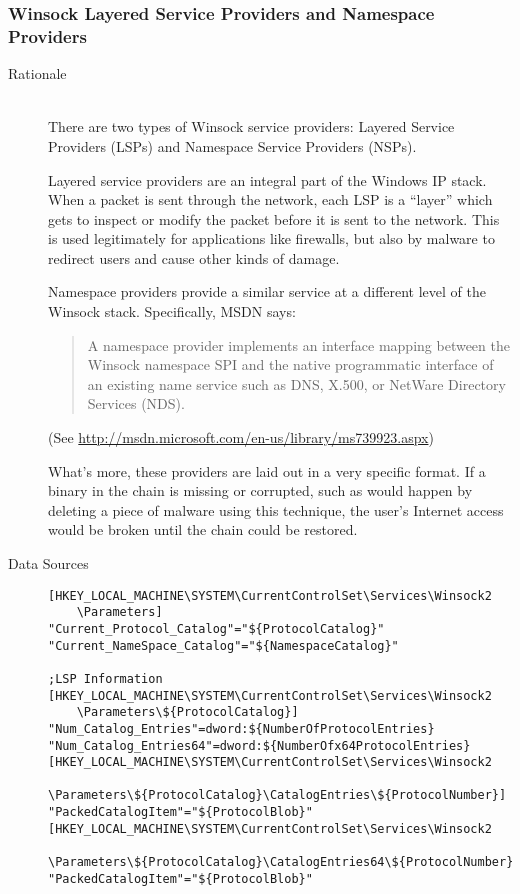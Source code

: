\subsubsection{Winsock Layered Service Providers and Namespace Providers}
\label{sec:lsp}
\begin{description}
\item[Rationale] \hfill \\
There are two types of Winsock service providers: Layered Service Providers
(LSPs) and Namespace Service Providers (NSPs).

Layered service providers are an integral part of the Windows IP stack. When a
packet is sent through the network, each LSP is a ``layer'' which gets to
inspect or modify the packet before it is sent to the network. This is used
legitimately for applications like firewalls, but also by malware to redirect
users and cause other kinds of damage.

Namespace providers provide a similar service at a different level of the
Winsock stack. Specifically, MSDN says:
\begin{quote}
A namespace provider implements an interface mapping between the Winsock
namespace SPI and the native programmatic interface of an existing name
service such as DNS, X.500, or NetWare Directory Services (NDS).
\end{quote}
(See \url{http://msdn.microsoft.com/en-us/library/ms739923.aspx})

What's more, these providers are laid out in a very specific format. If a binary
in the chain is missing or corrupted, such as would happen by deleting a piece
of malware using this technique, the user's Internet access would be broken
until the chain could be restored.
\item[Data Sources] \hfill
\begin{verbatim}
[HKEY_LOCAL_MACHINE\SYSTEM\CurrentControlSet\Services\Winsock2
    \Parameters]
"Current_Protocol_Catalog"="${ProtocolCatalog}"
"Current_NameSpace_Catalog"="${NamespaceCatalog}"

;LSP Information
[HKEY_LOCAL_MACHINE\SYSTEM\CurrentControlSet\Services\Winsock2
    \Parameters\${ProtocolCatalog}]
"Num_Catalog_Entries"=dword:${NumberOfProtocolEntries}
"Num_Catalog_Entries64"=dword:${NumberOfx64ProtocolEntries}
[HKEY_LOCAL_MACHINE\SYSTEM\CurrentControlSet\Services\Winsock2
    \Parameters\${ProtocolCatalog}\CatalogEntries\${ProtocolNumber}]
"PackedCatalogItem"="${ProtocolBlob}"
[HKEY_LOCAL_MACHINE\SYSTEM\CurrentControlSet\Services\Winsock2
    \Parameters\${ProtocolCatalog}\CatalogEntries64\${ProtocolNumber}]
"PackedCatalogItem"="${ProtocolBlob}"


\end{verbatim}
\end{description}
